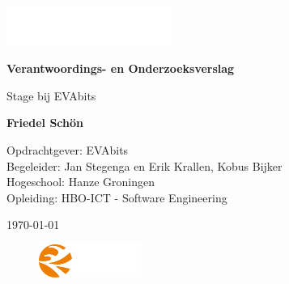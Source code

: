 \begin{titlepage}
\pagecolor{darkgray}\afterpage{\nopagecolor}
\color{white}
\centering
\vspace*{1cm}

\includegraphics[width=0.4\textwidth]{evabits-white.png}\par\vspace{1cm} %

\Huge
\textbf{Verantwoordings- en Onderzoeksverslag}

\vspace{0.5cm}
\LARGE
Stage bij EVAbits

\vspace{1.5cm}

\textbf{Friedel Schön}

\vfill

\Large
Opdrachtgever: EVAbits \\
Begeleider: Jan Stegenga en Erik Krallen, Kobus Bijker \\
Hogeschool: Hanze Groningen \\
Opleiding: HBO-ICT - Software Engineering

\vspace{0.8cm}

\Large
\today

\vspace{1cm}

\begin{figure}[ht]
    \centering
    \includegraphics[width=0.3\textwidth]{hanze-white.png} %
\end{figure}

\end{titlepage}